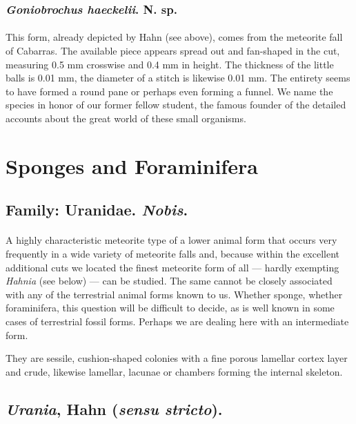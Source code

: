 \documentclass[a4paper, 12pt, oneside]{article}
\begin{document}
\subsubsection{\emph{Goniobrochus haeckelii}. N. sp.}
\paragraph{}
This form, already depicted by Hahn (see above), comes from the meteorite fall of Cabarras. The available piece appears spread out and fan-shaped in the cut, measuring 0.5 mm crosswise and 0.4 mm in height. The thickness of the little balls is 0.01 mm, the diameter of a stitch is likewise 0.01 mm. The entirety seems to have formed a round pane or perhaps even forming a funnel. We name the species in honor of our former fellow student, the famous founder of the detailed accounts about the great world of these small organisms.
\clearpage
\section{Sponges and Foraminifera}
\subsection{Family: Uranidae. \emph{Nobis}.}
\paragraph{}
A highly characteristic meteorite type of a lower animal form that occurs very frequently in a wide variety of meteorite falls and, because within the excellent additional cuts we located the finest meteorite form of all --- hardly exempting \emph{Hahnia} (see below) --- can be studied. The same cannot be closely associated with any of the terrestrial animal forms known to us. Whether sponge, whether foraminifera, this question will be difficult to decide, as is well known in some cases of terrestrial fossil forms. Perhaps we are dealing here with an intermediate form.

They are sessile, cushion-shaped colonies with a fine porous lamellar cortex layer and crude, likewise lamellar, lacunae or chambers forming the internal skeleton.
\subsection{\emph{Urania}, Hahn (\emph{sensu stricto}).}
\end{document}
